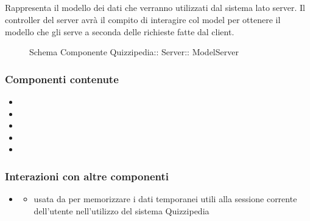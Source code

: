 \subsection{}
Rappresenta il modello dei dati che verranno utilizzati dal sistema lato server. 
Il controller del server avrà il compito di interagire col model per ottenere il modello che gli serve a seconda delle richieste fatte dal client.
\begin{figure}[H]
\centering
\noindent{}
\caption[Schema Componente ModelServer]{Schema Componente Quizzipedia:: Server:: ModelServer}
\end{figure}
\subsubsection{Componenti contenute}
\begin{itemize}
\item {}
\item {}
\item {}
\item {}
\item {}
\end{itemize}
\subsubsection{Interazioni con altre componenti}
\begin{itemize}
\item {}
\begin{itemize}
\item usata da  per memorizzare i dati temporanei utili alla sessione corrente dell'utente nell'utilizzo del sistema Quizzipedia
\end{itemize}
\end{itemize}
